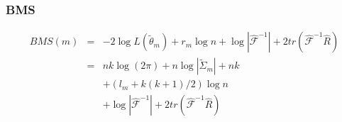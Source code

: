 \subsubsection{BMS}

\begin{eqnarray*}
BMS\left(m\right) & = & -2\log L\left(\widetilde{\theta}_{m}\right)+r_{m}\log n+\log\left\vert \hat{\mathcal{F}}^{-1}\right\vert +2tr\left(\hat{\mathcal{F}}^{-1}\hat{R}\right)\\
 & = & nk\log\left(2\pi\right)+n\log\left\vert \widetilde{\Sigma}_{m}\right\vert +nk\\
 &  & +\left(l_{m}+k\left(k+1\right)/2\right)\log n\\
 &  & +\log\left\vert \hat{\mathcal{F}}^{-1}\right\vert +2tr\left(\hat{\mathcal{F}}^{-1}\hat{R}\right)
\end{eqnarray*}

